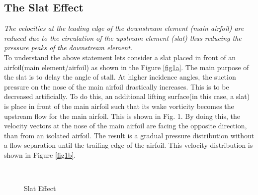 \documentclass[main.tex]{subfiles}
\begin{document}
\subsection{The Slat Effect}
\textit{The velocities at the leading edge of the downstream element (main airfoil) are reduced due to the circulation of the upstream element (slat) thus reducing the pressure peaks of the downstream element.}\cite{slat} 
\\To understand the above statement lets consider a slat placed in front of an airfoil(main element/airfoil) as shown in the Figure \ref{fig1a}. The main purpose of the slat is to delay the angle of stall. At higher incidence angles, the suction pressure on the nose of the main airfoil drastically increases. This is to be decreased artificially. To do this, an additional lifting surface(in this case, a slat) is place in front of the main airfoil such that its wake vorticity becomes the upstream flow for the main airfoil. This is shown in Fig. 1. By doing this, the velocity vectors at the nose of the main airfoil are facing the opposite direction, than from an isolated airfoil. The result is a gradual pressure distribution without a flow separation until the trailing edge of the airfoil. This velocity distribution is shown in Figure \ref{fig1b}.
\begin{figure}[h!]
    \vspace*{-1.5em}\centering
     \hspace*{-1.2em}
     \\\vspace*{-0.5em}
    \caption{Slat Effect}
    \label{fig1}
\end{figure}
\end{document}
